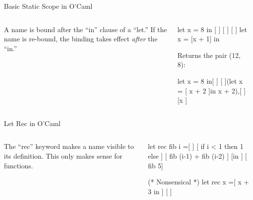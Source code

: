 \documentclass{plt}
\begin{document}
\begin{frame}[fragile]{Basic Static Scope in O'Caml}
  \begin{columns}
    \begin{column}{0.5\textwidth}
A name is bound after the ``in'' clause of a ``let.''  If the name is
re-bound, the binding takes effect \emph{after} the ``in.''
    \end{column}
    \begin{column}{0.5\textwidth}
\begin{showscope}
let x = 8 in [             ]
[                          ]
[                          ]
let x = [x + 1] in

\end{showscope}

Returns the pair (12, 8):

\begin{showscope}
let x = 8 in[              ]
[  ](let x = [ x + 2 ]in
    x + 2),[               ]
[x                         ]%
\end{showscope}

    \end{column}
  \end{columns}
\end{frame}

\begin{frame}[fragile]{Let Rec in O'Caml}
  \begin{columns}
    \begin{column}{0.5\textwidth}
The ``rec'' keyword makes a name visible to its definition.  This only
makes sense for functions.
    \end{column}
    \begin{column}{0.5\textwidth}
\begin{showscope}
let rec fib i =[           ]
[  if i < 1 then 1 else    ]
[    fib (i-1) + fib (i-2) ]
[in                        ]
[  fib 5]%
\end{showscope}

\begin{showscope}
(* Nonsensical *)
let rec x =[ x + 3 in      ]
[                          ]
\end{showscope}
    \end{column}
  \end{columns}
\end{frame}
\end{document}
